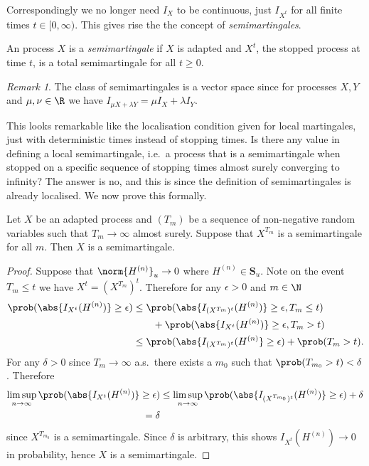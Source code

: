 \documentclass{scrreprt}
\theoremstyle{remark}
\newtheorem{remark}{Remark}
\newcommand{\simpro}{\mathbf S}
\begin{document}
Correspondingly we no longer need $I_X$ to be continuous, just $I_{X^t}$ for all finite times $t \in [0, \infty)$. This gives rise the the concept of \emph{semimartingales}.

\begin{defn}
	An process $X$ is a \emph{semimartingale} if $X$ is adapted and $X^t$, the stopped process at time $t$, is a total semimartingale for all $t \geq 0$.
\end{defn}
\begin{remark}
	The class of semimartingales is a vector space since for processes $X, Y$ and $\mu, \nu \in \R$ we have $I_{\mu X + \lambda Y} = \mu I_X + \lambda I_Y$.
\end{remark}

This looks remarkable like the localisation condition given for local martingales, just with deterministic times instead of stopping times. Is there any value in defining a local semimartingale, i.e.\ a process that is a semimartingale when stopped on a specific sequence of stopping times almost surely converging to infinity? The answer is no, and this is since the definition of semimartingales is already localised. We now prove this formally.

\begin{prop}
	\label{prop:semi-locality}
	Let $X$ be an adapted process and $(T_m)$ be a sequence of non-negative random variables such that $T_m \to \infty$ almost surely. Suppose that $X^{T_m}$ is a semimartingale for all $m$. Then $X$ is a semimartingale.
\end{prop}
\begin{proof}
	Suppose that $\norm{H^{(n)}}_u \to 0$ where $H^{(n)} \in \simpro_u$. Note on the event $T_m \leq t$ we have $X^t = (X^{T_m})^t$. Therefore for any $\epsilon > 0$ and $m \in \N$
	\begin{align}
		\prob(\abs{I_{X^t}(H^{(n)})} \geq \epsilon)
		&\leq \prob(\abs{I_{(X^{T_m})^t}(H^{(n)})} \geq \epsilon, T_m \leq t) \nonumber \\
		& \qquad + \prob(\abs{I_{X^t}(H^{(n)})} \geq \epsilon, T_m > t) \\
		&\leq \prob(\abs{I_{(X^{T_m})^t}(H^{(n)}} \geq \epsilon) + \prob(T_m > t) .
	\end{align}
	For any $\delta > 0$ since $T_m \to \infty$ a.s.\ there exists a $m_0$ such that $\prob(T_{m_0} > t) < \delta$. Therefore
	\begin{align}
		\limsup_{n \to \infty} \prob(\abs{I_{X^t}(H^{(n)})} \geq \epsilon)
		&\leq \limsup_{n \to \infty} \prob(\abs{I_{(X^{T_{m_0}})^t}(H^{(n)})} \geq \epsilon) + \delta \\
		=\delta
	\end{align}
	since $X^{T_{m_0}}$ is a semimartingale. Since $\delta$ is arbitrary, this shows $I_{X^t}(H^{(n)}) \to 0$ in probability, hence $X$ is a semimartingale.
\end{proof}
\end{document}
